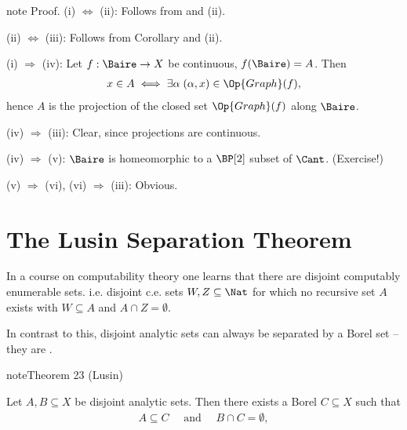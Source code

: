 \documentclass[letterpaper,10pt,english]{jupyterBook}
\begin{document}
\begin{sphinxadmonition}{note}
\sphinxAtStartPar
Proof. (i) \(\Leftrightarrow\) (ii): Follows from {\hyperref[\detokenize{polish:thm-polish-cont-image-Baire}]{}} and {\hyperref[\detokenize{analytic:prop-prop-analytic}]{}} (ii).

\sphinxAtStartPar
(ii) \(\Leftrightarrow\) (iii): Follows from Corollary {\hyperref[\detokenize{imagesBorel:cor-Borel-image-closed}]{}} and {\hyperref[\detokenize{analytic:prop-prop-analytic}]{}} (ii).

\sphinxAtStartPar
(i) \(\Rightarrow\) (iv):  Let \(f:\Baire \to X\) be continuous, \(f(\Baire) = A\). Then
\begin{equation*}
\begin{split}
    x \in A \iff \exists \alpha \; (\alpha,x) \in \Op{Graph}(f),
\end{split}
\end{equation*}
\sphinxAtStartPar
hence \(A\) is the projection of the closed set \(\Op{Graph}(f)\) along \(\Baire\).

\sphinxAtStartPar
(iv) \(\Rightarrow\) (iii): Clear, since projections are continuous.

\sphinxAtStartPar
(iv) \(\Rightarrow\) (v): \(\Baire\) is homeomorphic to a \(\BP[2]\) subset of \(\Cant\). (Exercise!)

\sphinxAtStartPar
(v) \(\Rightarrow\) (vi), (vi) \(\Rightarrow\) (iii): Obvious.
\end{sphinxadmonition}


\section{The Lusin Separation Theorem}
\label{\detokenize{analytic:the-lusin-separation-theorem}}
\sphinxAtStartPar
In a course on computability theory one learns that there are  disjoint computably enumerable sets. i.e. disjoint c.e. sets \(W,Z \subseteq \Nat\) for which no recursive set \(A\) exists with \(W \subseteq A\) and \(A \cap Z = \emptyset\).

\sphinxAtStartPar
In contrast to this, disjoint analytic sets can always be separated by a Borel set – they are .
\label{analytic:thm-Lusin-separation}
\begin{sphinxadmonition}{note}{Theorem 23 (Lusin)}



\sphinxAtStartPar
Let \(A, B \subseteq X\) be disjoint analytic sets. Then there exists a Borel \(C \subseteq X\) such that
\begin{equation*}
\begin{split}
        A \subseteq C \quad \text{ and } \quad B \cap C = \emptyset,
\end{split}
\end{equation*}\end{sphinxadmonition}
\end{document}

